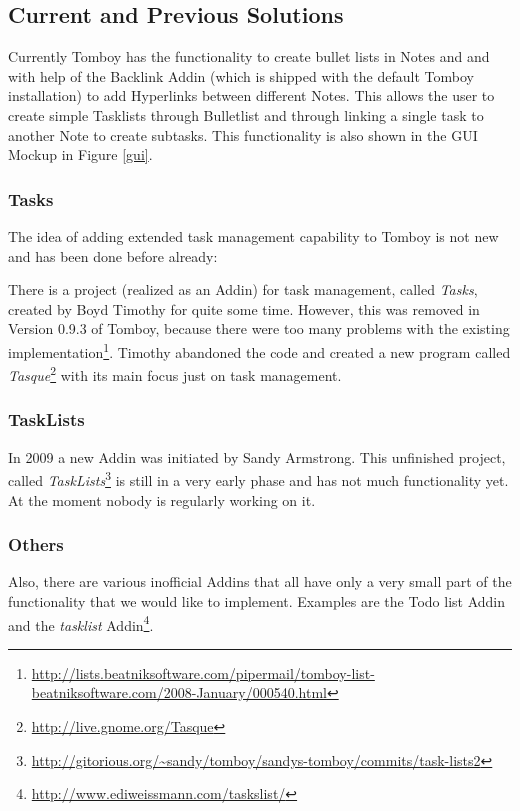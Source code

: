 \subsection{Current and Previous Solutions}
\label{description:solution}
Currently Tomboy has the functionality to create bullet lists in Notes and and with help of the Backlink Addin (which is shipped with the default Tomboy installation) to add Hyperlinks between different Notes. This allows the user to create simple Tasklists through Bulletlist and through linking a single task to another Note to create subtasks. This functionality is also shown in the GUI Mockup in Figure \ref{gui}.

\subsubsection{Tasks} The idea of adding extended task management capability to Tomboy is not new and has been done before already:

There is a project (realized as an Addin) for task management, called \textit{Tasks}, created by Boyd Timothy for quite some time. However, this was removed in Version 0.9.3 of Tomboy, because there were too many problems with the existing implementation\footnote{\url{http://lists.beatniksoftware.com/pipermail/tomboy-list-beatniksoftware.com/2008-January/000540.html}}. Timothy abandoned the code and created a new program called \textit{Tasque}\footnote{\url{http://live.gnome.org/Tasque}} with its main focus just on task management.

\subsubsection{TaskLists}
In 2009 a new Addin was initiated by Sandy Armstrong. This unfinished project, called \textit{TaskLists}\footnote{\url{http://gitorious.org/~sandy/tomboy/sandys-tomboy/commits/task-lists2}} is still in a very early phase and has not much functionality yet. At the moment nobody is regularly working on it.

\subsubsection{Others}
Also, there are various inofficial Addins that all have only a very small part of the functionality that we would like to implement. Examples are the Todo %
list Addin and the \textit{tasklist} Addin\footnote{\url{http://www.ediweissmann.com/taskslist/}}.

